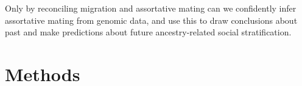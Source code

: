 \documentclass[11pt]{article}
\begin{document}
Only by reconciling migration and assortative mating can we confidently infer assortative mating from genomic data, and use this to draw conclusions about past and make predictions about future ancestry-related social stratification.










\vspace{8mm}
\section{Methods}



\end{document}
